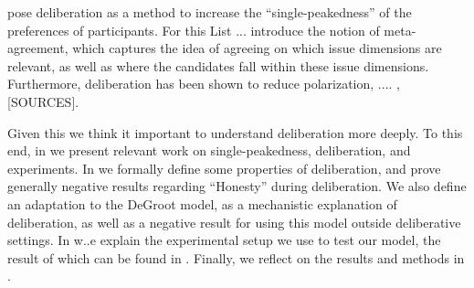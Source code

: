 \citet{listTwoConceptsAgreement2002} pose deliberation as a method to increase
the ``single-peakedness'' of the preferences of participants. For this List ...
introduce the notion of meta-agreement, which captures the idea of agreeing on
which issue dimensions are relevant, as well as where the candidates fall
within these issue dimensions. Furthermore, deliberation has been shown to
reduce polarization, .... , [SOURCES].

Given this we think it important to understand deliberation more deeply. To
this end, in  we present relevant work on single-peakedness,
deliberation, and experiments. In  we formally define some
properties of deliberation, and prove generally negative results regarding
``Honesty'' during deliberation. We also define an adaptation to the DeGroot
model, as a mechanistic explanation of deliberation, as well as a negative
result for using this model outside deliberative settings. In 
w..e explain the experimental setup we use to test our model, the result of
which can be found in . Finally, we reflect on the
results and methods in .


